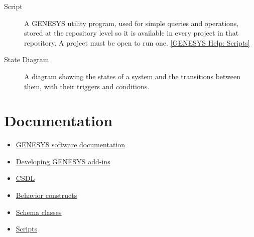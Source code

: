 \begin{appendices}
\begin{description}
  \item[Script] A GENESYS utility program, used for simple queries and operations, stored at the repository level so it is available in every project in that repository. A project must be open to run one. \href{https://genesys-help.vitechcorp.com/genesys-help/scripts}{[GENESYS Help: Scripts]}

  \item[State Diagram] A diagram showing the states of a system and the transitions between them, with their triggers and conditions.
\end{description}

\chapter{Documentation}
\label{app:documentation}

\begin{itemize}
  \item \href{https://www.zuken.com/us/resource/genesys-software-documentation/}{GENESYS software documentation}
  \item \href{https://genesys-help.vitechcorp.com/genesys-help/developing-genesys-add-ins}{Developing GENESYS add-ins}
  \item \href{https://genesys-help.vitechcorp.com/genesys-help/language-the-comprehensive-systems-design-language-csdl}{CSDL}
  \item \href{https://genesys-help.vitechcorp.com/genesys-help/behavior-constructs}{Behavior constructs}
  \item \href{https://genesys-help.vitechcorp.com/genesys-help/schema-classes}{Schema classes}
  \item \href{https://genesys-help.vitechcorp.com/genesys-help/scripts}{Scripts}
\end{itemize}
\end{appendices}